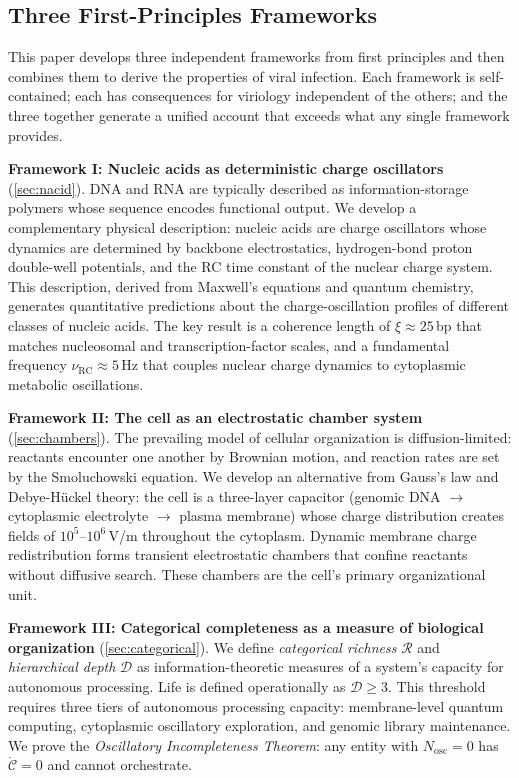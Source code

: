 \documentclass[11pt,twocolumn,a4paper]{article}
\theoremstyle{definition}
\theoremstyle{remark}
\newcommand{\nuRC}{\nu_{\mathrm{RC}}}
\newcommand{\Nosc}{N_{\mathrm{osc}}}
\newcommand{\Rcat}{\mathcal{R}}
\newcommand{\Dcat}{\mathcal{D}}
\begin{document}
\subsection{Three First-Principles Frameworks}

This paper develops three independent frameworks from first principles and then combines them to derive the properties of viral infection. Each framework is self-contained; each has consequences for viriology independent of the others; and the three together generate a unified account that exceeds what any single framework provides.

\textbf{Framework I: Nucleic acids as deterministic charge oscillators} (\cref{sec:nacid}). DNA and RNA are typically described as information-storage polymers whose sequence encodes functional output. We develop a complementary physical description: nucleic acids are charge oscillators whose dynamics are determined by backbone electrostatics, hydrogen-bond proton double-well potentials, and the RC time constant of the nuclear charge system. This description, derived from Maxwell's equations and quantum chemistry, generates quantitative predictions about the charge-oscillation profiles of different classes of nucleic acids. The key result is a coherence length of $\xi \approx 25$\,bp that matches nucleosomal and transcription-factor scales, and a fundamental frequency $\nuRC \approx 5$\,Hz that couples nuclear charge dynamics to cytoplasmic metabolic oscillations.

\textbf{Framework II: The cell as an electrostatic chamber system} (\cref{sec:chambers}). The prevailing model of cellular organization is diffusion-limited: reactants encounter one another by Brownian motion, and reaction rates are set by the Smoluchowski equation. We develop an alternative from Gauss's law and Debye-H\"{u}ckel theory: the cell is a three-layer capacitor (genomic DNA $\to$ cytoplasmic electrolyte $\to$ plasma membrane) whose charge distribution creates fields of $10^5$--$10^6$\,V/m throughout the cytoplasm. Dynamic membrane charge redistribution forms transient electrostatic chambers that confine reactants without diffusive search. These chambers are the cell's primary organizational unit.

\textbf{Framework III: Categorical completeness as a measure of biological organization} (\cref{sec:categorical}). We define \emph{categorical richness} $\Rcat$ and \emph{hierarchical depth} $\Dcat$ as information-theoretic measures of a system's capacity for autonomous processing. Life is defined operationally as $\Dcat \geq 3$. This threshold requires three tiers of autonomous processing capacity: membrane-level quantum computing, cytoplasmic oscillatory exploration, and genomic library maintenance. We prove the \emph{Oscillatory Incompleteness Theorem}: any entity with $\Nosc = 0$ has $\dot{\mathcal{C}} = 0$ and cannot orchestrate.
\end{document}
